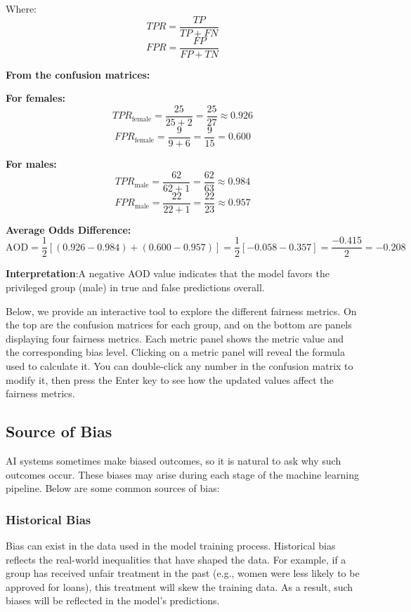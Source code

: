 Where:
$$TPR = \frac{TP}{TP + FN}$$
$$FPR = \frac{FP}{FP + TN}$$

\textbf{From the confusion matrices:}

\textbf{For females:}
$$
TPR_{\text{female}} = \frac{25}{25 + 2} = \frac{25}{27} \approx 0.926
$$
$$
FPR_{\text{female}} = \frac{9}{9 + 6} = \frac{9}{15} = 0.600
$$

\textbf{For males:}
$$
TPR_{\text{male}} = \frac{62}{62 + 1} = \frac{62}{63} \approx 0.984
$$
$$
FPR_{\text{male}} = \frac{22}{22 + 1} = \frac{22}{23} \approx 0.957
$$

\textbf{Average Odds Difference:}
$$
\text{AOD} = \frac{1}{2} \left[ (0.926 - 0.984) + (0.600 - 0.957) \right] = \frac{1}{2} \left[ -0.058 - 0.357 \right] = \frac{-0.415}{2} = -0.208
$$

\par \textbf{Interpretation}:A negative AOD value indicates that the model favors the privileged group (male) in true and false predictions overall.

\par Below, we provide an interactive tool to explore the different fairness metrics. On the top are the confusion matrices for each group, and on the bottom are panels displaying four fairness metrics. Each metric panel shows the metric value and the corresponding bias level. Clicking on a metric panel will reveal the formula used to calculate it. You can double-click any number in the confusion matrix to modify it, then press the Enter key to see how the updated values affect the fairness metrics.

\begin{visualComponent}
\end{visualComponent}


\subsection{Source of Bias}
AI systems sometimes make biased outcomes, so it is natural to ask why such outcomes occur. These biases may arise during each stage of the machine learning pipeline. Below are some common sources of bias: 


\subsubsection{Historical Bias}
Bias can exist in the data used in the model training process. Historical bias reflects the real-world inequalities that have shaped the data. For example, if a group has received unfair treatment in the past (e.g., women were less likely to be approved for loans), this treatment will skew the training data. As a result, such biases will be reflected in the model's predictions.


